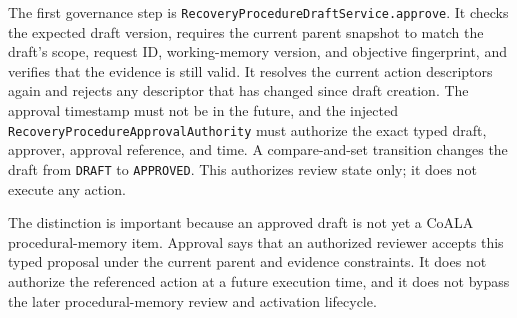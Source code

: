 The first governance step is \texttt{Recovery\allowbreak Procedure\allowbreak Draft\allowbreak Service.\allowbreak approve}. It checks the expected draft version, requires the current parent snapshot to match the draft's scope, request ID, working-memory version, and objective fingerprint, and verifies that the evidence is still valid. It resolves the current action descriptors again and rejects any descriptor that has changed since draft creation. The approval timestamp must not be in the future, and the injected \texttt{Recovery\allowbreak Procedure\allowbreak Approval\allowbreak Authority} must authorize the exact typed draft, approver, approval reference, and time. A compare-and-set transition changes the draft from \texttt{DRAFT} to \texttt{APPROVED}. This authorizes review state only; it does not execute any action.

The distinction is important because an approved draft is not yet a CoALA procedural-memory item. Approval says that an authorized reviewer accepts this typed proposal under the current parent and evidence constraints. It does not authorize the referenced action at a future execution time, and it does not bypass the later procedural-memory review and activation lifecycle.

